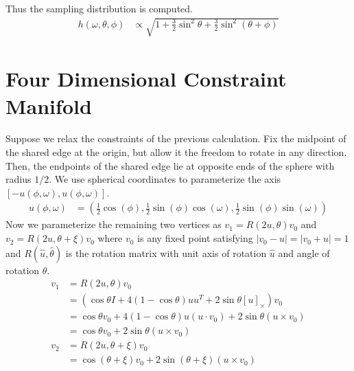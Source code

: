 \documentclass[12pt]{article}
\newcommand*{\Scale}[2][4]{\scalebox{#1}{$#2$}}%
\begin{document}
Thus the sampling distribution is computed.
\begin{align}
h(\omega, \theta, \phi) &\propto \sqrt{1 + \frac{3}{2}\sin^2\theta + \frac{3}{2}\sin^2(\theta + \phi)}
\end{align}

\section{Four Dimensional Constraint Manifold} 

Suppose we relax the constraints of the previous calculation. Fix the midpoint of the shared edge at the origin, but allow it the freedom to rotate in any direction. Then, the endpoints of the shared edge lie at opposite ends of the sphere with radius $1/2$. We use spherical coordinates to parameterize the axis $[-u(\phi,\omega),u(\phi,\omega)]$.
\begin{align}
u(\phi,\omega) &= \left(\frac{1}{2}\cos(\phi),\frac{1}{2}\sin(\phi)\cos(\omega), \frac{1}{2}\sin(\phi)\sin(\omega) \right)
\end{align}
Now we parameterize the remaining two vertices as $v_1 = R(2u, \theta)v_0$ and $v_2 = R(2u, \theta + \xi)v_0$ where $v_0$ is any fixed point satisfying $|v_0 - u| = |v_0 + u| = 1$ and $R(\hat{u},\hat{\theta})$ is the rotation matrix with unit axis of rotation $\hat{u}$ and angle of rotation $\hat{\theta}$. 
\begin{align}
v_1 &= R(2u, \theta)v_0 \\
&= \left(\cos\theta I + 4(1-\cos\theta)uu^T + 2\sin\theta[u]_\times\right)v_0 \\
&= \cos\theta v_0 + 4(1-\cos\theta)u(u\cdot v_0) + 2\sin\theta (u\times v_0) \\
&= \cos\theta v_0 + 2\sin\theta (u\times v_0) \\
v_2 &= R(2u, \theta + \xi)v_0 \\
&= \cos(\theta+\xi) v_0 + 2\sin(\theta + \xi) (u\times v_0)
\end{align}


\end{document}
